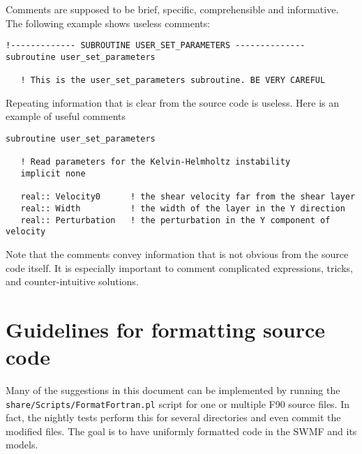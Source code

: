\documentclass{article}
\begin{document}
Comments are supposed to be brief, specific, comprehensible and informative. 
The following example shows useless comments:
\begin{verbatim}
!------------- SUBROUTINE USER_SET_PARAMETERS --------------
subroutine user_set_parameters

   ! This is the user_set_parameters subroutine. BE VERY CAREFUL
\end{verbatim}
Repeating information that is clear from the source code is useless. Here is
an example of useful comments
\begin{verbatim}
subroutine user_set_parameters

   ! Read parameters for the Kelvin-Helmholtz instability
   implicit none

   real:: Velocity0      ! the shear velocity far from the shear layer
   real:: Width          ! the width of the layer in the Y direction
   real:: Perturbation   ! the perturbation in the Y component of velocity

\end{verbatim}
Note that the comments convey information that is not obvious from the 
source code itself. It is especially important to comment complicated
expressions, tricks, and counter-intuitive solutions. 


\section{Guidelines for formatting source code}

Many of the suggestions in this document can be implemented by
running the {\tt share/Scripts/FormatFortran.pl} script for one
or multiple F90 source files. In fact, the nightly tests perform
this for several directories and even commit the modified files.
The goal is to have uniformly formatted code in the SWMF and its
models.
\end{document}
